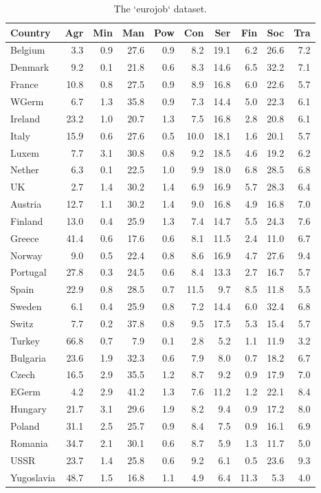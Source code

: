 \documentclass[]{book}
\theoremstyle{definition}
\theoremstyle{definition}
\theoremstyle{definition}
\theoremstyle{remark}
\begin{document}
\begin{longtable}[t]{lrrrrrrrrr}
\caption{\label{tab:eurotable}The `eurojob` dataset.}\\
\toprule
Country & Agr & Min & Man & Pow & Con & Ser & Fin & Soc & Tra\\
\midrule
Belgium & 3.3 & 0.9 & 27.6 & 0.9 & 8.2 & 19.1 & 6.2 & 26.6 & 7.2\\
Denmark & 9.2 & 0.1 & 21.8 & 0.6 & 8.3 & 14.6 & 6.5 & 32.2 & 7.1\\
France & 10.8 & 0.8 & 27.5 & 0.9 & 8.9 & 16.8 & 6.0 & 22.6 & 5.7\\
WGerm & 6.7 & 1.3 & 35.8 & 0.9 & 7.3 & 14.4 & 5.0 & 22.3 & 6.1\\
Ireland & 23.2 & 1.0 & 20.7 & 1.3 & 7.5 & 16.8 & 2.8 & 20.8 & 6.1\\
\addlinespace
Italy & 15.9 & 0.6 & 27.6 & 0.5 & 10.0 & 18.1 & 1.6 & 20.1 & 5.7\\
Luxem & 7.7 & 3.1 & 30.8 & 0.8 & 9.2 & 18.5 & 4.6 & 19.2 & 6.2\\
Nether & 6.3 & 0.1 & 22.5 & 1.0 & 9.9 & 18.0 & 6.8 & 28.5 & 6.8\\
UK & 2.7 & 1.4 & 30.2 & 1.4 & 6.9 & 16.9 & 5.7 & 28.3 & 6.4\\
Austria & 12.7 & 1.1 & 30.2 & 1.4 & 9.0 & 16.8 & 4.9 & 16.8 & 7.0\\
\addlinespace
Finland & 13.0 & 0.4 & 25.9 & 1.3 & 7.4 & 14.7 & 5.5 & 24.3 & 7.6\\
Greece & 41.4 & 0.6 & 17.6 & 0.6 & 8.1 & 11.5 & 2.4 & 11.0 & 6.7\\
Norway & 9.0 & 0.5 & 22.4 & 0.8 & 8.6 & 16.9 & 4.7 & 27.6 & 9.4\\
Portugal & 27.8 & 0.3 & 24.5 & 0.6 & 8.4 & 13.3 & 2.7 & 16.7 & 5.7\\
Spain & 22.9 & 0.8 & 28.5 & 0.7 & 11.5 & 9.7 & 8.5 & 11.8 & 5.5\\
\addlinespace
Sweden & 6.1 & 0.4 & 25.9 & 0.8 & 7.2 & 14.4 & 6.0 & 32.4 & 6.8\\
Switz & 7.7 & 0.2 & 37.8 & 0.8 & 9.5 & 17.5 & 5.3 & 15.4 & 5.7\\
Turkey & 66.8 & 0.7 & 7.9 & 0.1 & 2.8 & 5.2 & 1.1 & 11.9 & 3.2\\
Bulgaria & 23.6 & 1.9 & 32.3 & 0.6 & 7.9 & 8.0 & 0.7 & 18.2 & 6.7\\
Czech & 16.5 & 2.9 & 35.5 & 1.2 & 8.7 & 9.2 & 0.9 & 17.9 & 7.0\\
\addlinespace
EGerm & 4.2 & 2.9 & 41.2 & 1.3 & 7.6 & 11.2 & 1.2 & 22.1 & 8.4\\
Hungary & 21.7 & 3.1 & 29.6 & 1.9 & 8.2 & 9.4 & 0.9 & 17.2 & 8.0\\
Poland & 31.1 & 2.5 & 25.7 & 0.9 & 8.4 & 7.5 & 0.9 & 16.1 & 6.9\\
Romania & 34.7 & 2.1 & 30.1 & 0.6 & 8.7 & 5.9 & 1.3 & 11.7 & 5.0\\
USSR & 23.7 & 1.4 & 25.8 & 0.6 & 9.2 & 6.1 & 0.5 & 23.6 & 9.3\\
Yugoslavia & 48.7 & 1.5 & 16.8 & 1.1 & 4.9 & 6.4 & 11.3 & 5.3 & 4.0\\
\bottomrule
\end{longtable}
\end{document}
